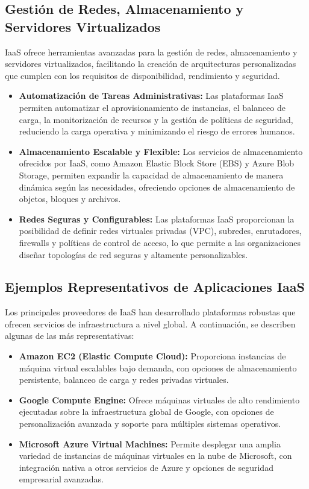{        \subsection{Gestión de Redes, Almacenamiento y Servidores Virtualizados}
            IaaS ofrece herramientas avanzadas para la gestión de redes, almacenamiento y servidores virtualizados, facilitando la creación de arquitecturas personalizadas que cumplen con los requisitos de disponibilidad, rendimiento y seguridad.
            
            \begin{itemize}
                \item \textbf{Automatización de Tareas Administrativas:} Las plataformas IaaS permiten automatizar el aprovisionamiento de instancias, el balanceo de carga, la monitorización de recursos y la gestión de políticas de seguridad, reduciendo la carga operativa y minimizando el riesgo de errores humanos.
                \item \textbf{Almacenamiento Escalable y Flexible:} Los servicios de almacenamiento ofrecidos por IaaS, como Amazon Elastic Block Store (EBS) y Azure Blob Storage, permiten expandir la capacidad de almacenamiento de manera dinámica según las necesidades, ofreciendo opciones de almacenamiento de objetos, bloques y archivos.
                \item \textbf{Redes Seguras y Configurables:} Las plataformas IaaS proporcionan la posibilidad de definir redes virtuales privadas (VPC), subredes, enrutadores, firewalls y políticas de control de acceso, lo que permite a las organizaciones diseñar topologías de red seguras y altamente personalizables.
            \end{itemize}
            
        \subsection{Ejemplos Representativos de Aplicaciones IaaS}
            Los principales proveedores de IaaS han desarrollado plataformas robustas que ofrecen servicios de infraestructura a nivel global. A continuación, se describen algunas de las más representativas:
            
            \begin{itemize}
                \item \textbf{Amazon EC2 (Elastic Compute Cloud):} Proporciona instancias de máquina virtual escalables bajo demanda, con opciones de almacenamiento persistente, balanceo de carga y redes privadas virtuales.
                \item \textbf{Google Compute Engine:} Ofrece máquinas virtuales de alto rendimiento ejecutadas sobre la infraestructura global de Google, con opciones de personalización avanzada y soporte para múltiples sistemas operativos.
                \item \textbf{Microsoft Azure Virtual Machines:} Permite desplegar una amplia variedad de instancias de máquinas virtuales en la nube de Microsoft, con integración nativa a otros servicios de Azure y opciones de seguridad empresarial avanzadas.
            \end{itemize}
            
}
